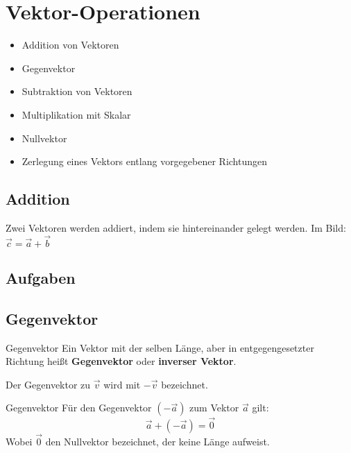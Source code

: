 \section{Vektor-Operationen}

\begin{itemize}
\item Addition von Vektoren
\item Gegenvektor
\item Subtraktion von Vektoren
\item Multiplikation mit Skalar
\item Nullvektor
\item Zerlegung eines Vektors entlang vorgegebener Richtungen
\end{itemize}

\newpage

\subsection{Addition}

Zwei Vektoren werden addiert, indem sie hintereinander gelegt
werden. Im Bild: $\vec{c} = \vec{a} + \vec{b}$


\subsection*{Aufgaben}

\newpage


\subsection{Gegenvektor}

\begin{definition}{Gegenvektor}{}
  Ein Vektor mit der selben Länge, aber in entgegengesetzter Richtung
  heißt \textbf{Gegenvektor} oder \textbf{inverser Vektor}.

  Der Gegenvektor zu $\vec{v}$ wird mit $-\vec{v}$ bezeichnet.
\end{definition}

\begin{bemerkung}{Gegenvektor}{}
  Für den Gegenvektor $(-\vec{a})$ zum Vektor $\vec{a}$ gilt:
  $$\vec{a} + (-\vec{a}) = \vec{0}$$
Wobei $\vec{0}$ den Nullvektor bezeichnet, der keine Länge aufweist.
  
\end{bemerkung}

